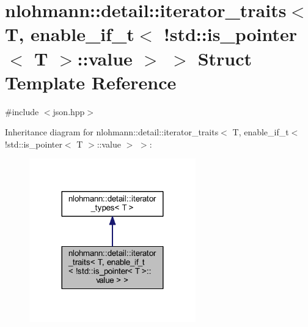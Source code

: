 \hypertarget{structnlohmann_1_1detail_1_1iterator__traits_3_01_t_00_01enable__if__t_3_01_9std_1_1is__pointer_3_01_t_01_4_1_1value_01_4_01_4}{}\section{nlohmann\+::detail\+::iterator\+\_\+traits$<$ T, enable\+\_\+if\+\_\+t$<$ !std\+::is\+\_\+pointer$<$ T $>$\+::value $>$ $>$ Struct Template Reference}
\label{structnlohmann_1_1detail_1_1iterator__traits_3_01_t_00_01enable__if__t_3_01_9std_1_1is__pointer_3_01_t_01_4_1_1value_01_4_01_4}


{\ttfamily \#include $<$json.\+hpp$>$}



Inheritance diagram for nlohmann\+::detail\+::iterator\+\_\+traits$<$ T, enable\+\_\+if\+\_\+t$<$ !std\+::is\+\_\+pointer$<$ T $>$\+::value $>$ $>$\+:
\nopagebreak
\begin{figure}[H]
\begin{center}
\leavevmode
\includegraphics[width=204pt]{structnlohmann_1_1detail_1_1iterator__traits_3_01_t_00_01enable__if__t_3_01_9std_1_1is__pointer_9e42d78d8a69b8b9f7486f18562b11fc}
\end{center}
\end{figure}


